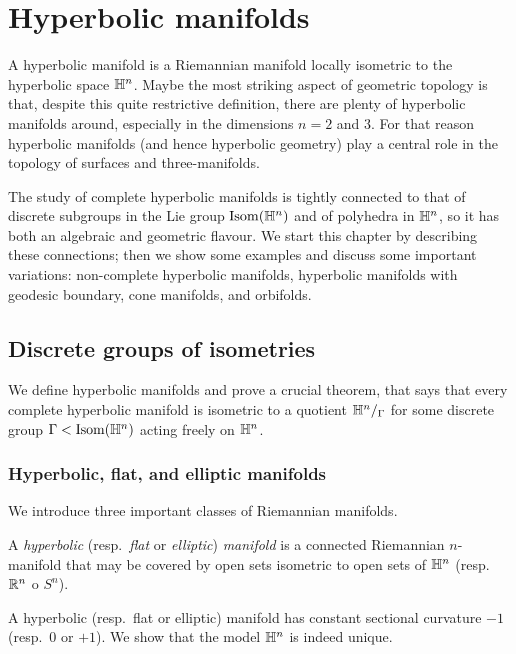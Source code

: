 \chapter{Hyperbolic manifolds} \label{varieta:chapter} \label{manifold:chapter} 
 \label{orbifold:chapter} \label{orbifolds:chapter}

A hyperbolic manifold is a Riemannian manifold locally isometric to the hyperbolic space $\mathbb{H}^n$. Maybe the most striking aspect of geometric topology is that, despite this quite restrictive definition, there are plenty of hyperbolic manifolds around, especially in the dimensions $n=2$ and $3$. For that reason hyperbolic manifolds (and hence hyperbolic geometry) play a central role in the topology of surfaces and three-manifolds.

The study of complete hyperbolic manifolds is tightly connected to that of discrete subgroups in the Lie group ${\rm Isom}(\mathbb{H}^n)$ and of polyhedra in $\mathbb{H}^n$, so it has both an algebraic and geometric flavour. We start this chapter by describing these connections; then we show some examples and discuss some important variations: non-complete hyperbolic manifolds, hyperbolic manifolds with geodesic boundary, cone manifolds, and orbifolds.

\section{Discrete groups of isometries}
We define hyperbolic manifolds and prove a crucial theorem, that says that every complete hyperbolic manifold is isometric to a quotient $\mathbb{H}^n/_\Gamma$ for some discrete group $\Gamma <{\rm Isom}(\mathbb{H}^n)$ acting freely on $\mathbb{H}^n$.

\subsection{Hyperbolic, flat, and elliptic manifolds}
We introduce three important classes of Riemannian manifolds.
  

\begin{defn} A \emph{hyperbolic} (resp.~\emph{flat} or \emph{elliptic}) \emph{manifold} is a connected Riemannian $n$-manifold that may be covered by open sets isometric to open sets of $\mathbb{H}^n$ (resp.~$\mathbb{R}^n$ o $S^n$). 
\end{defn}

A hyperbolic (resp.~flat or elliptic) manifold has constant sectional curvature $-1$ (resp.~$0$ or $+1$). We show that the model $\mathbb{H}^n$ is indeed unique.


